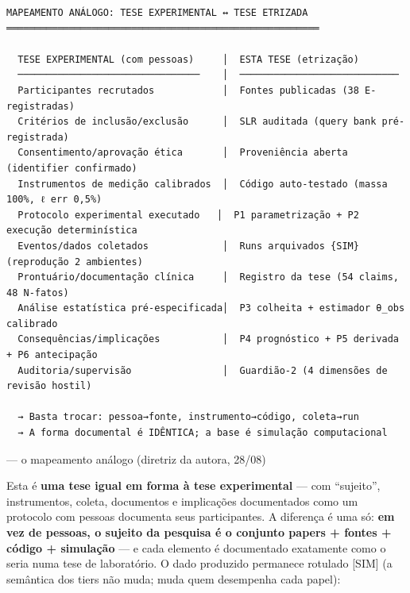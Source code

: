 \documentclass[
  10pt,
]{article}
\begin{document}
\begin{verbatim}
MAPEAMENTO ANÁLOGO: TESE EXPERIMENTAL ↔ TESE ETRIZADA
═══════════════════════════════════════════════════════

  TESE EXPERIMENTAL (com pessoas)     │  ESTA TESE (etrização)
  ────────────────────────────────    │  ────────────────────────────
  Participantes recrutados            │  Fontes publicadas (38 E-registradas)
  Critérios de inclusão/exclusão      │  SLR auditada (query bank pré-registrada)
  Consentimento/aprovação ética       │  Proveniência aberta (identifier confirmado)
  Instrumentos de medição calibrados  │  Código auto-testado (massa 100%, ℓ err 0,5%)
  Protocolo experimental executado   │  P1 parametrização + P2 execução determinística
  Eventos/dados coletados             │  Runs arquivados {SIM} (reprodução 2 ambientes)
  Prontuário/documentação clínica     │  Registro da tese (54 claims, 48 N-fatos)
  Análise estatística pré-especificada│  P3 colheita + estimador θ_obs calibrado
  Consequências/implicações           │  P4 prognóstico + P5 derivada + P6 antecipação
  Auditoria/supervisão                │  Guardião-2 (4 dimensões de revisão hostil)

  → Basta trocar: pessoa→fonte, instrumento→código, coleta→run
  → A forma documental é IDÊNTICA; a base é simulação computacional
\end{verbatim}

--- o mapeamento análogo (diretriz da autora, 28/08)

Esta é \textbf{uma tese igual em forma à tese experimental} --- com
``sujeito'', instrumentos, coleta, documentos e implicações documentados
como um protocolo com pessoas documenta seus participantes. A diferença
é uma só: \textbf{em vez de pessoas, o sujeito da pesquisa é o conjunto
papers + fontes + código + simulação} --- e cada elemento é documentado
exatamente como o seria numa tese de laboratório. O dado produzido
permanece rotulado {[}SIM{]} (a semântica dos tiers não muda; muda quem
desempenha cada papel):
\end{document}
